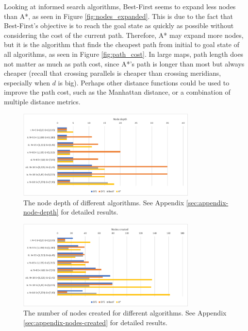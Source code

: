 \documentclass[letterpaper,12pt]{article}
\begin{document}
Looking at informed search algorithms, Best-First seems to expand less nodes than A*, as seen in Figure \ref{fig:nodes_expanded}. This is due to the fact that Best-First's objective is to reach the goal state as quickly as possible without considering the cost of the current path. Therefore, A* may expand more nodes, but it is the algorithm that finds the cheapest path from initial to goal state of all algorithms, as seen in Figure \ref{fig:path_cost}. In large maps, path length does not matter as much as path cost, since A*'s path is longer than most but always cheaper (recall that crossing parallels is cheaper than crossing meridians, especially when $d$ is big). Perhaps other distance functions could be used to improve the path cost, such as the Manhattan distance, or a combination of multiple distance metrics.

\begin{figure}[ht]
\centering
\includegraphics[width=0.8\textwidth]{report/figures/node_depth.png}
\caption{\label{fig:node_depth}The node depth of different algorithms. See Appendix \ref{sec:appendix-node-depth} for detailed results.}
\end{figure}

\begin{figure}[ht]
\centering
\includegraphics[width=0.8\textwidth]{report/figures/nodes_created.png}
\caption{\label{fig:nodes_created}The number of nodes created for different algorithms. See Appendix \ref{sec:appendix-nodes-created} for detailed results.}
\end{figure}
\end{document}
